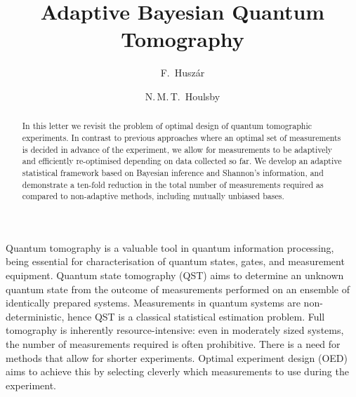\documentclass[aps,twocolumn,prl]{revtex4-1}
\begin{document}
%
\title{Adaptive Bayesian Quantum Tomography}

\author{F.~Husz\'{a}r}
%
\author{N.\,M.\,T.~Houlsby}
%

\begin{abstract}
In this letter we revisit the problem of optimal design of quantum tomographic experiments. In contrast to previous approaches where an optimal set of measurements is decided in advance of the experiment, we allow for measurements to be adaptively and efficiently re-optimised depending on data collected so far. We develop an adaptive statistical framework based on Bayesian inference and Shannon's information, and demonstrate a ten-fold reduction in the total number of measurements required as compared to non-adaptive methods, including mutually unbiased bases.
\end{abstract}

\maketitle

Quantum tomography is a valuable tool in quantum information processing, being essential for characterisation of quantum states, gates, and measurement equipment.  Quantum state tomography (QST) aims to determine an unknown quantum state from the outcome of measurements performed on an ensemble of identically prepared systems. Measurements in quantum systems are non-deterministic, hence QST is a classical statistical estimation problem. Full tomography is inherently resource-intensive: even in moderately sized systems, the number of measurements required is often prohibitive.
There is a need for methods that allow for shorter experiments. Optimal experiment design (OED) aims to achieve this by selecting cleverly which measurements to use during the experiment.
\end{document}
